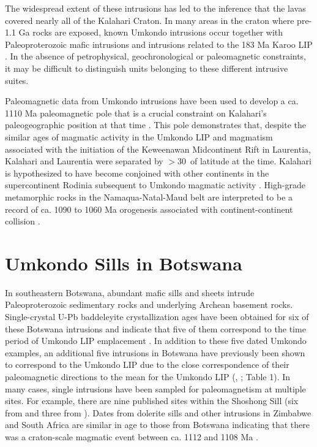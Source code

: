 \documentclass[11pt,letterpaper]{article}
\begin{document}
The widespread extent of these intrusions has led to the inference that the lavas covered nearly all of the Kalahari Craton. In many areas in the craton where pre-1.1 Ga rocks are exposed, known Umkondo intrusions occur together with Paleoproterozoic mafic intrusions and intrusions related to the 183 Ma Karoo LIP \citep{Svensen2012a}. In the absence of petrophysical, geochronological or paleomagnetic constraints, it may be difficult to distinguish units belonging to these different intrusive suites.

Paleomagnetic data from Umkondo intrusions have been used to develop a ca. 1110 Ma paleomagnetic pole that is a crucial constraint on Kalahari's paleogeographic position at that time \citep{Powell2001a,Gose2006a}. This pole demonstrates that, despite the similar ages of magmatic activity in the Umkondo LIP and magmatism associated with the initiation of the Keweenawan Midcontinent Rift in Laurentia, Kalahari and Laurentia were separated by $>$30\textdegree\ of latitude at the time. Kalahari is hypothesized to have become conjoined with other continents in the supercontinent Rodinia subsequent to Umkondo magmatic activity \citep{Jacobs2008a,Li2008a}. High-grade metamorphic rocks in the Namaqua-Natal-Maud belt are interpreted to be a record of ca. 1090 to 1060 Ma orogenesis associated with continent-continent collision \citep{Jacobs2008a}. 

\section*{Umkondo Sills in Botswana}
In southeastern Botswana, abundant mafic sills and sheets intrude Paleoproterozoic sedimentary rocks and underlying Archean basement rocks.  Single-crystal U-Pb baddeleyite crystallization ages have been obtained for six of these Botswana intrusions and indicate that five of them correspond to the time period of Umkondo LIP emplacement \citep{Hanson2004a}. In addition to these five dated Umkondo examples, an additional five intrusions in Botswana have previously been shown to correspond to the Umkondo LIP due to the close correspondence of their paleomagnetic directions to the mean for the Umkondo LIP (\citealp{Jones1966a}, \citealp{Gose2006a}; Table 1). In many cases, single intrusions have been sampled for paleomagnetism at multiple sites. For example, there are nine published sites within the Shoshong Sill (six from \cite{Jones1966a} and three from \cite{Gose2006a}). Dates from dolerite sills and other intrusions in Zimbabwe and South Africa are similar in age to those from Botswana indicating that there was a craton-scale magmatic event between ca. 1112 and 1108 Ma \citep{Hanson2004a}.
\end{document}
